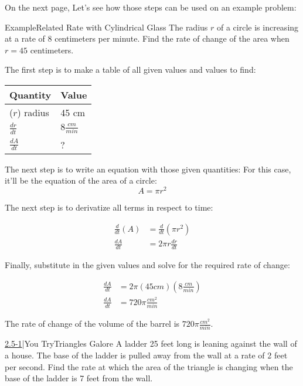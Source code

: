 \documentclass{MathNotes}
\newenvironment{example}[1]
{\begin{BlueBox}{Example}{#1}}{\end{BlueBox}}
\newenvironment{practice}[2]
{\begin{PurpleBox}{\texorpdfstring{#1}\Big|You Try}{#2}}{\end{PurpleBox}}
\begin{document}
On the next page, Let's see how those steps can be used on an example problem:
\begin{example}{Related Rate with Cylindrical Glass}
    The radius $r$ of a circle is increasing at a rate of 8 centimeters per
    minute. Find the rate of change of the area when $r = 45$ centimeters.

    The first step is to make a table of all given values and values to find:
    \begin{center}
        \begin{tabular}{l|l}
            Quantity & Value\\
            \hline
            ($r$) radius & 45 cm\\
            $\frac{dr}{dt}$ & $8\frac{cm}{min}$\\
            $\frac{dA}{dt}$ & ?\\
        \end{tabular}
    \end{center}

    The next step is to write an equation with those given quantities: For this
    case, it'll be the equation of the area of a circle: $$A=\pi r^2$$
   
    The next step is to derivatize all terms in respect to time:

    \begin{align*}
        \frac{d}{dt}(A)&=\frac{d}{dt}(\pi r^2)\\
        \frac{dA}{dt}&=2\pi r\frac{dr}{dt}
    \end{align*}

    Finally, substitute in the given values and solve for the required rate
    of change:

    \begin{align*}
        \frac{dA}{dt}&=2\pi (45cm)(8\frac{cm}{min})\\
        \frac{dA}{dt}&=720\pi\frac{cm^2}{min}
    \end{align*}

    The rate of change of the volume of the barrel is $720\pi\frac{cm^2}{min}$.
\end{example}

\begin{practice}{\hyperref[ans:2.5-1]{2.5-1}}{Triangles Galore}
    \label{prac:2.5-1}
    A ladder 25 feet long is leaning against the wall of a house. The base
    of the ladder is pulled away from the wall at a rate of 2 feet per
    second. Find the rate at which the area of the triangle is changing
    when the base of the ladder is 7 feet from the wall.
\end{practice}
\end{document}
